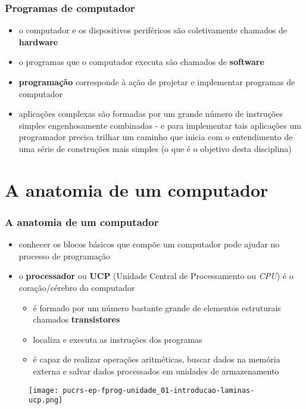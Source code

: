 \documentclass[aspectratio=169]{beamer}
\begin{document}
\begin{frame}\frametitle{Programas de computador}
\begin{itemize}
	\item o computador e os dispositivos periféricos são coletivamente chamados de \textbf{hardware}
	\item o programas que o computador executa são chamados de \textbf{software}
	\item \textbf{programação} corresponde à ação de projetar e implementar programas de computador
	\item aplicações complexas são formadas por um grande número de instruções simples engenhosamente combinadas - e para implementar tais aplicações um programador precisa trilhar um caminho que inicia com o entendimento de uma série de construções mais simples (o que é o objetivo desta disciplina)
\end{itemize}
\end{frame}

\section{A anatomia de um computador}

\begin{frame}\frametitle{A anatomia de um computador}
\begin{itemize}
	\item conhecer os blocos básicos que compõe um computador pode ajudar no processo de programação
	\item o \textbf{processador} ou \textbf{UCP} (Unidade Central de Processamento ou \emph{CPU}) é o coração/cérebro do computador
	\begin{itemize}
		\item é formado por um número bastante grande de elementos estruturais chamados \textbf{transistores}
		\item localiza e executa as instruções dos programas
		\item é capaz de realizar operações aritméticas, buscar dados na memória externa e salvar dados processados em unidades de armazenamento
	\end{itemize}
\end{itemize}
\begin{figure}[h]
	\centering
	\texttt{[image: pucrs-ep-fprog-unidade\_01-introducao-laminas-ucp.png]}
\end{figure}
\end{frame}
\end{document}
